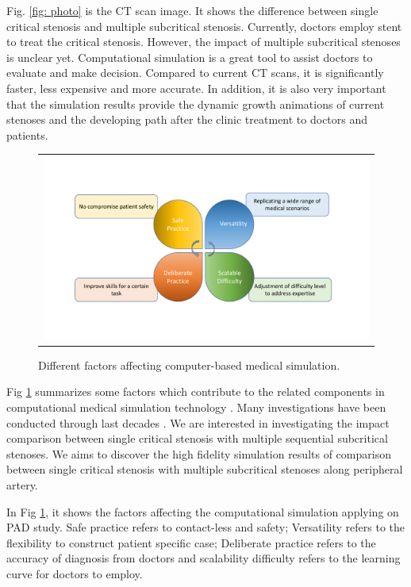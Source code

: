 Fig. \ref{fig: photo} is the CT scan image. It shows the difference between single critical stenosis and multiple subcritical stenosis. Currently, doctors employ stent to treat the critical stenosis. However, the impact of multiple subcritical stenoses is unclear yet. Computational simulation is a great tool to assist doctors to evaluate and make decision.
Compared to current CT scans, it is significantly faster, less expensive and more accurate. In addition, it is also very important that the simulation results provide the dynamic growth animations of current stenoses and the developing path after the clinic treatment to doctors and patients. 

\begin{figure}[H]
	\centering
	\begin{tabular}{c}
		\includegraphics[width=1.0\textwidth]{./pics/computer_simulation}
	\end{tabular}
	\caption{\footnotesize Different factors affecting computer-based medical simulation.} \label{fig: ch1f1}
\end{figure}

Fig \ref{fig: ch1f1} summarizes some factors which contribute to the related components in computational medical simulation technology \cite{barry2005features}. Many investigations have been conducted through last decades \cite{feng2012viscous, bertram2010evaluation, nadeem2010simulation, ogulu2005simulation}. We are interested in investigating the impact comparison between single critical stenosis with multiple sequential subcritical stenoses. We aims to discover the high fidelity simulation results of comparison between single critical stenosis with multiple subcritical stenoses along peripheral artery.

In Fig \ref{fig: ch1f1}, it shows the factors affecting the computational simulation applying on PAD study. Safe practice refers to contact-less and safety; Versatility refers to the flexibility to construct patient specific case; Deliberate practice refers to the accuracy of diagnosis from doctors and scalability difficulty refers to the learning curve for doctors to employ.

